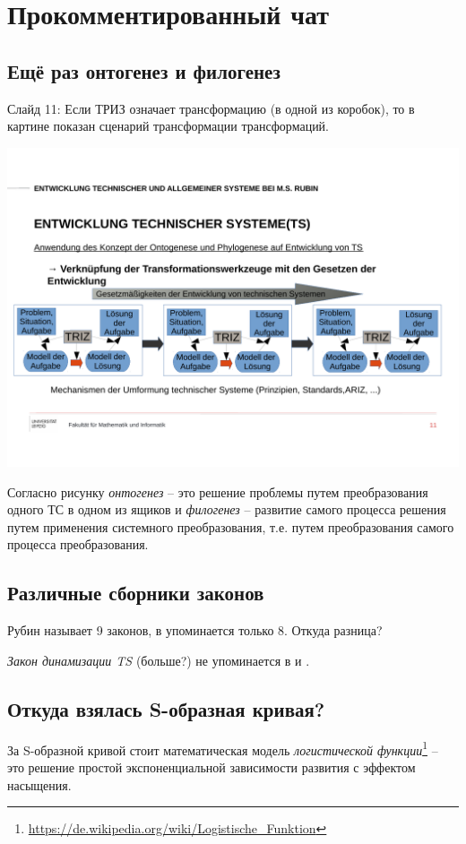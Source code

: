 \documentclass[a4paper,11pt]{article}
\begin{document}
\section{Прокомментированный чат}

\subsection*{Ещё раз онтогенез и филогенез}

Слайд 11: Если ТРИЗ означает трансформацию (в одной из коробок), то в картине
показан сценарий трансформации трансформаций.

\begin{center}
  \includegraphics[width=.7\textwidth]{Folie11.pdf}
\end{center}

Согласно рисунку \emph{онтогенез} -- это решение проблемы путем преобразования
одного ТС в одном из ящиков и \emph{филогенез} -- развитие самого процесса
решения путем применения системного преобразования, т.е. путем преобразования
самого процесса преобразования.

\subsection*{Различные сборники законов}

Рубин называет 9 законов, в \cite{Altschuller1979} упоминается только
8. Откуда разница? 

\emph{Закон динамизации TS} (больше?) не упоминается в \cite{Altschuller1979}
и \cite{Altschuller1980}.

\subsection*{Откуда взялась S-образная кривая?}

За S-образной кривой стоит математическая модель \emph{логистической
  функции}\footnote{\url{https://de.wikipedia.org/wiki/Logistische_Funktion}}
-- это решение простой экспоненциальной зависимости развития с эффектом
насыщения. 
\end{document}
